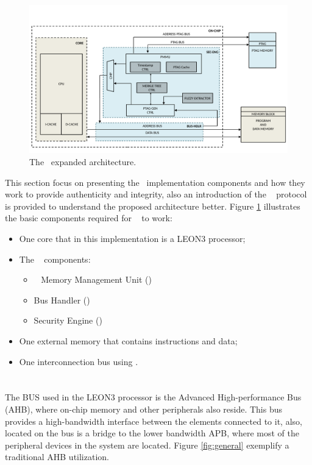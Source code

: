 \begin{figure}[!ht]
    \centering
    \includegraphics[width=\textwidth]{figures/pdf/CSHIA_detailed_caio_expansion.pdf}
    \caption{The \cshia~expanded architecture.}
    \label{fig:cshiaexpanded}
\end{figure}
 This section focus on presenting the \cshia~implementation components and how they work to provide authenticity and integrity, also an introduction of the \amba~ protocol is provided to understand the proposed architecture better. Figure \ref{fig:cshiaexpanded} illustrates the basic components required for \cshia~ to work: 
\begin{itemize}
    \item One core that in this implementation is a LEON3 processor;
    \item The \cshia~ components:
    \begin{itemize}
        \item \ptag~ Memory Management Unit (\pmmu)
        \item Bus Handler (\handler)
        \item Security Engine (\seceng) 
    \end{itemize}
    \item One external memory that contains instructions and data;
    \item One interconnection bus using \amba.
\end{itemize} 


\section{\amba}
\label{sec:amba2}


The BUS used in the LEON3 processor is the Advanced High-performance Bus (AHB), where on-chip memory and other peripherals also reside. This bus provides a high-bandwidth interface between the elements connected to it, also, located on the bus is a bridge to the lower bandwidth APB, where most of the peripheral devices in the system are located. Figure \ref{fig:general} exemplify a traditional AHB utilization.

